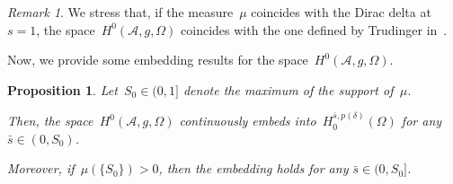 \documentclass[11pt,hyp,]{nyjm}
\numberwithin{equation}{section}
\newtheorem{proposition}[theorem]{Proposition}
\theoremstyle{remark}
\newtheorem{remark}[theorem]{Remark}
\begin{document}
\begin{remark}\label{eba}
We stress that, if the measure~$\mu$ coincides with the Dirac delta at~$s=1$,
the space~$H^{0}(\mathcal{A}, g, \Omega)$ coincides with the one defined by Trudinger in~\cite{trudinger}.
\end{remark}

{N}ow, we provide some embedding results for the space~$H^0(\mathcal{A}, g, \Omega)$. 
\begin{proposition}\label{ytr}
Let~$S_0 \in (0,1]$ denote the maximum of the support of~$\mu$.

Then, the space~$H^{0}(\mathcal{A}, g, \Omega)$ continuously embeds into~$H^{\bar{s},p(\delta)}_0(\Omega)$ for any $\bar{s} \in (0,S_0)$.

Moreover, if~$\mu\left(\{S_0\}\right)>0$, 
then the embedding holds for any $\bar{s}\in(0,S_0]$.
\end{proposition}
\end{document}
